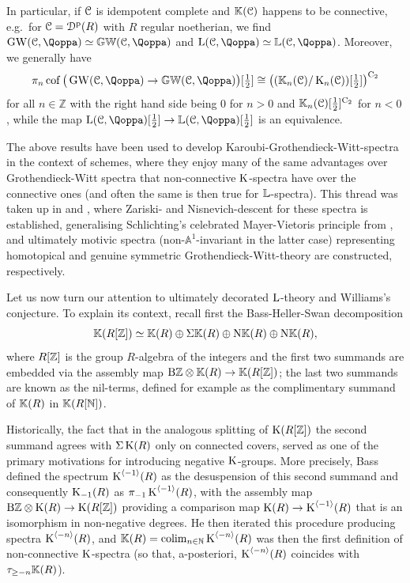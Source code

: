 In particular, if $\mathcal C$ is idempotent complete and $\mathbb K(\mathcal C)$ happens to be connective, e.g.\ for $\mathcal C = {\mathcal D}^{\mathrm{p}}(R)$ with $R$ regular noetherian, we find $\GW(\C,\QF) \simeq \KGW(\C,\QF)$ and $\L(\C,\QF) \simeq \KL(\C,\QF)$. Moreover, we generally have
\[
\pi_n\cof\big(\GW(\C,\QF) \to \KGW(\C,\QF)\big)[\tfrac{1}{2}] \cong \left((\KK_n(\C)/\K_n(\C))[\tfrac 1 2]\right)^{\Ct}
\]
for all $n \in \mathbb Z$ with the right hand side being $0$ for $n>0$ and $\mathbb K_n(\mathcal C)[\tfrac{1}{2}]^{\mathrm{C_2}}$ for $n<0$, while the map $\L(\C,\QF)[\frac{1}{2}] \to \KL(\C,\QF)[\frac{1}{2}]$ is an equivalence.


The above results have been used to develop Karoubi-Grothendieck-Witt-spectra in the context of schemes, where they enjoy many of the same advantages over Grothendieck-Witt spectra that non-connective $\operatorname K$-spectra have over the connective ones (and often the same is then true for $\mathbb{L}$-spectra). This thread was taken up in \cite{motives} and \cite{HL}, where Zariski- and Nisnevich-descent for these spectra is established, generalising Schlichting's celebrated Mayer-Vietoris principle from \cite{schlichting-mv}, and ultimately motivic spectra (non-$\mathbb A^1$-invariant in the latter case) representing homotopical and genuine symmetric Grothendieck-Witt-theory are constructed, respectively.








Let us now turn our attention to ultimately decorated $\operatorname L$-theory and Williams's conjecture. To explain its context, recall first the Bass-Heller-Swan %
decomposition %
\[
\mathbb K(R[\mathbb{Z}]) \simeq \mathbb K(R) \oplus \Sigma \mathbb K(R) \oplus \mathrm{N}\mathbb K(R)  \oplus \mathrm{N}\mathbb K(R),
\]
where $R[\mathbb{Z}]$ is the group $R$-algebra of the integers and the first two summands are embedded via the assembly map $\mathrm{B}\mathbb{Z} \otimes \mathbb K(R) \to \mathbb K(R[\mathbb Z])$; the last two summands are known as the nil-terms, defined for example as the complimentary summand of $\mathbb K(R)$ in $\mathbb K(R[\mathbb N])$. 

Historically, the fact that in the analogous splitting of $\operatorname K(R[\mathbb Z])$ the second summand agrees with $\Sigma \operatorname K(R)$ only on connected covers, served as one of the primary motivations for introducing negative $\operatorname K$-groups. More precisely, Bass defined the spectrum $\operatorname K^{\langle -1 \rangle}(R)$ as the desuspension of this second summand and consequently $\operatorname K_{-1}(R)$ as $\pi_{-1}\operatorname K^{\langle -1 \rangle}(R)$, with the assembly map $\mathrm B\mathbb Z \otimes \operatorname K(R) \rightarrow \operatorname K(R[\mathbb Z])$ providing a comparison map $\operatorname K(R) \rightarrow \operatorname K^{\langle -1 \rangle}(R)$ that is an isomorphism in non-negative degrees. He then iterated this procedure producing spectra $\operatorname K^{\langle -n \rangle}(R)$, and $\mathbb K(R) = \mathop{\mathrm{colim}}_{n \in \mathbb N} \operatorname K^{\langle -n \rangle}(R)$ was then the first definition of non-connective $\operatorname K$-spectra (so that, a-posteriori, $\operatorname K^{\langle -n \rangle}(R)$ coincides with $\tau_{\geq -n} \mathbb K(R)$). 

